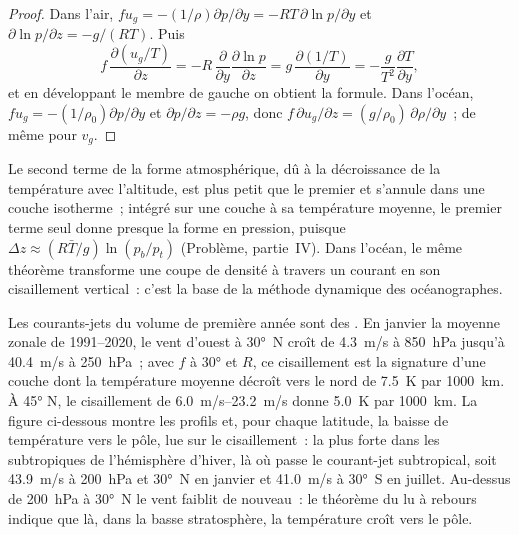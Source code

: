 \begin{proof}
Dans l'air, $fu_g = -(1/\rho)\partial p/\partial y = -RT\,\partial\ln
p/\partial y$ et $\partial\ln p/\partial z = -g/(RT)$. Puis
\[
f\,\frac{\partial(u_g/T)}{\partial z} = -R\,\frac{\partial}{\partial y}\frac{\partial\ln p}{\partial z}
= g\,\frac{\partial(1/T)}{\partial y} = -\frac{g}{T^2}\frac{\partial T}{\partial y} ,
\]
et en développant le membre de gauche on obtient la formule. Dans l'océan, $fu_g = -(1/\rho_0)\partial
p/\partial y$ et $\partial p/\partial z = -\rho g$, donc $f\,\partial u_g/
\partial z = (g/\rho_0)\,\partial\rho/\partial y$~; de même pour $v_g$.
\end{proof}

Le second terme de la forme atmosphérique, dû à la décroissance de la température
avec l'altitude, est plus petit que le premier et s'annule dans une
couche isotherme~; intégré sur une couche à sa température moyenne, le premier terme
seul donne presque la forme en pression, puisque $\Delta z \approx (R\bar T/g)
\ln(p_b/p_t)$ (Problème, partie~IV). Dans l'océan, le même théorème transforme une
coupe de densité à travers un courant en son cisaillement vertical~:
c'est la base de la méthode dynamique des océanographes.


Les courants-jets du volume de première année sont des . En janvier
la moyenne zonale de 1991--2020, le vent d'ouest à \ang{30}~N croît de
\qty{4.3}{m/s} à \qty{850}{hPa} jusqu'à \qty{40.4}{m/s} à \qty{250}{hPa}~; avec
$f$ à \ang{30} et $R$, ce cisaillement est la signature d'une couche dont la
température moyenne décroît vers le nord de \qty{7.5}{K} par \qty{1000}{km}. À \ang{45}
N, le cisaillement de \qtyrange{6.0}{23.2}{m/s} donne \qty{5.0}{K} par
\qty{1000}{km}. La figure ci-dessous montre les profils et, pour chaque latitude,
la baisse de température vers le pôle, lue sur le cisaillement~: la plus forte dans les
subtropiques de l'hémisphère d'hiver, là où passe le courant-jet subtropical,
soit \qty{43.9}{m/s} à \qty{200}{hPa} et \ang{30}~N en janvier et
\qty{41.0}{m/s} à \ang{30}~S en juillet. Au-dessus de \qty{200}{hPa} à \ang{30}~N
le vent faiblit de nouveau~: le théorème du  lu à rebours indique que
là, dans la basse stratosphère, la température croît vers le pôle.

